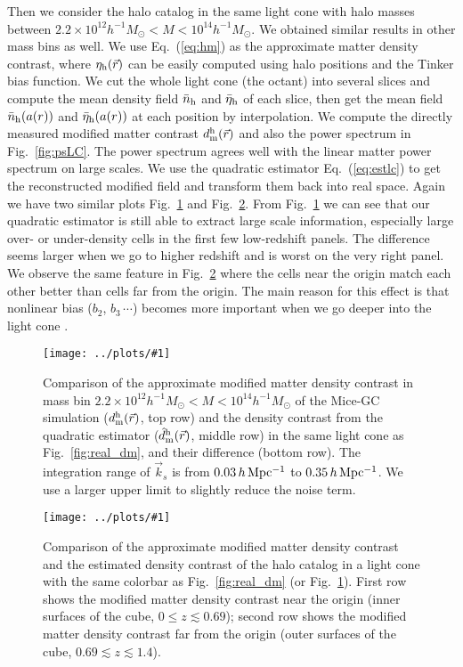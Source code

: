 \documentclass[prd,amsmath,amssymb,floatfix,superscriptaddress,nofootinbib,twocolumn]{revtex4-1}
\newcommand{\vrr}{\vec{r}}
\newcommand{\vk}{\vec{k}}
\newcommand{\ec}[1]{Eq.~(\ref{eq:#1})}
\newcommand{\rf}[1]{\ref{fig:#1}}
\newcommand{\sfig}[2]{
\texttt{[image: ../plots/\#1]}
        }
\newcommand{\Sfig}[2]{
   \begin{figure}[thbp]
   \begin{center}
    \sfig{../plots/#1.pdf}{\columnwidth}
    \caption{{\small #2}}
    \label{fig:#1}
     \end{center}
   \end{figure}
}
\begin{document}
Then we consider the halo catalog in the same light cone with halo masses between $2.2 \times 10^{12}h^{-1}M_{\odot}<M < 10^{14}h^{-1}M_{\odot}$. We obtained similar results in other mass bins as well. We use \ec{hm} as the approximate matter density contrast, where $\eta_{\rm h}(\vrr)$ can be easily computed using halo positions and the Tinker bias function. We cut the whole light cone (the octant) into several slices and compute the mean density field $\bar{{n}}_{\rm h}$ and $\bar{\eta}_{\rm h}$ of each slice, then get the mean field  $\bar{{n}}_{\rm h}(a(r))$ and $\bar{\eta}_{\rm h}(a(r))$ at each position by interpolation. We compute the directly measured modified matter contrast $d_{\rm m}^{\rm h}(\vrr)$ and also the power spectrum in Fig.~\rf{psLC}. The power spectrum agrees well with the linear matter power spectrum on large scales. We use the quadratic estimator \ec{estlc} to get the reconstructed modified field and transform them back into real space. Again we have two similar plots Fig.~\rf{real_halo} and Fig.~\rf{cube_halo}. From Fig.~\rf{real_halo} we can see that our quadratic estimator is still able to extract large scale information, especially large over- or under-density cells in the first few low-redshift panels. The difference seems larger when we go to higher redshift and is worst on the very right panel. We observe the same feature in Fig.~\rf{cube_halo} where the cells near the origin match each other better than cells far from the origin. The main reason for this effect is that nonlinear bias ($b_{2}$, $b_{3}\,\cdots$) becomes more important when we go deeper into the light cone \cite{Lazeyras:2016nbs}.

\Sfig{real_halo}{Comparison of the approximate modified matter density contrast in mass bin $2.2 \times 10^{12}h^{-1}M_{\odot}<M < 10^{14}h^{-1}M_{\odot}$ of the Mice-GC simulation ($d^{\rm h}_{\rm m}(\vrr)$, top row) and the density contrast from the quadratic estimator ($\hat{d}^{\rm h}_{\rm m}(\vrr)$, middle row) in the same light cone as Fig.~\rf{real_dm}, and their difference (bottom row). The integration range of $\vk_{s}$ is from $0.03\, h \rm \, Mpc^{-1}$ to $0.35\, h \rm \, Mpc^{-1}$. We use a larger upper limit to slightly reduce the noise term.} 
\Sfig{cube_halo}{Comparison of the approximate modified matter density contrast and the estimated density contrast of the halo catalog in a light cone with the same colorbar as Fig.~\rf{real_dm} (or Fig.~\rf{real_halo}). First row shows the modified matter density contrast near the origin (inner surfaces of the cube, $0\leqslant z \lesssim 0.69$); second row shows the modified matter density contrast far from the origin (outer surfaces of the cube, $0.69\lesssim z \lesssim 1.4$).}
\end{document}
